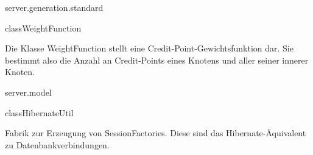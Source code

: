 \begin{texdocpackage}{server.generation.standard}
\begin{texdocclass}{class}{WeightFunction}
\label{texdoclet:edu.kit.informatik.studyplan.server.generation.standard.WeightFunction}
\begin{texdocclassintro}
Die Klasse WeightFunction stellt eine Credit-Point-Gewichtsfunktion dar. Sie bestimmt also die Anzahl an Credit-Points
 eines Knotens und aller seiner innerer Knoten.\end{texdocclassintro}
\begin{texdocclassconstructors}
\end{texdocclassconstructors}
\begin{texdocclassmethods}
\end{texdocclassmethods}
\end{texdocclass}


\end{texdocpackage}



\begin{texdocpackage}{server.model}
\label{texdoclet:edu.kit.informatik.studyplan.server.model}

\begin{texdocclass}{class}{HibernateUtil}
\label{texdoclet:edu.kit.informatik.studyplan.server.model.HibernateUtil}
\begin{texdocclassintro}
Fabrik zur Erzeugung von SessionFactories. Diese sind das Hibernate-Äquivalent zu Datenbankverbindungen.\end{texdocclassintro}
\begin{texdocclassconstructors}
\end{texdocclassconstructors}
\begin{texdocclassmethods}
\end{texdocclassmethods}
\end{texdocclass}


\end{texdocpackage}



